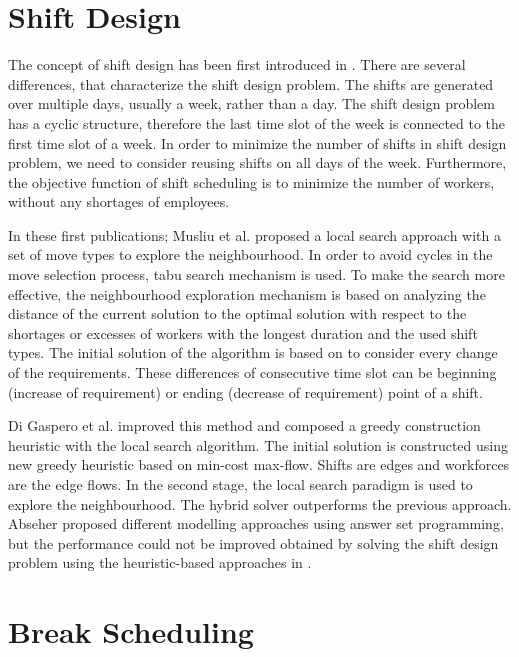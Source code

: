 \section{Shift Design}

The concept of shift design has been first introduced in \cite{li:2001:gärtner} \cite{li:2004:musliu} \cite{li:2001:musliu}. There are several differences, that characterize the shift design problem. The shifts are generated over multiple days, usually a week, rather than a day. The shift design problem has a cyclic structure, therefore the last time slot of the week is connected to the first time slot of a week. In order to minimize the number of shifts in shift design problem, we need to consider reusing shifts on all days of the week. Furthermore, the objective function of shift scheduling is to minimize the number of workers, without any shortages of employees. 

In these first publications; Musliu et al. proposed a local search approach with a set of move types to explore the neighbourhood. In order to avoid cycles in the move selection process, tabu search mechanism is used. To make the search more effective, the neighbourhood exploration mechanism is based on analyzing the distance of the current solution to the optimal solution with respect to the shortages or excesses of workers with the longest duration and the used shift types. The initial solution of the algorithm is based on to consider every change of the requirements. These differences of consecutive time slot can be beginning (increase of requirement) or ending (decrease of requirement) point of a shift. 

Di Gaspero et al. \cite{li:2007:gaspero} improved this method and composed a greedy construction heuristic with the local search algorithm. The initial solution is constructed using new greedy heuristic based on min-cost max-flow. Shifts are edges and workforces are the edge flows. In the second stage, the local search paradigm is used to explore the neighbourhood. The hybrid solver outperforms the previous approach. Abseher \cite{li:2010:abseher} proposed different modelling approaches using answer set programming, but the performance could not be improved obtained by solving the shift design problem using the heuristic-based approaches in \cite{li:2007:gaspero}.

\section{Break Scheduling}


